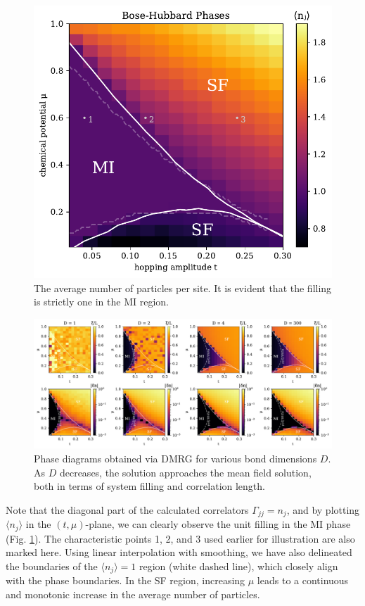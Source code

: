 \begin{figure}[b]
\includegraphics[width=0.9\linewidth]{imgs/phases.pdf}
\caption{The average number of particles per site. It is evident that the filling is strictly one in the MI region.}
\label{fig:phases}
\end{figure}


\begin{figure}[t]
    \centering
    \includegraphics[width=\textwidth]{imgs/phases2mf.pdf}
    \caption{Phase diagrams obtained via DMRG for various bond dimensions $D$. As $D$ decreases, the solution approaches the mean field solution, both in terms of system filling and correlation length.}
    \label{fig:mf}
\end{figure}


Note that the diagonal part of the calculated correlators $\Gamma_{jj} = n_j$, and by plotting $\langle n_j\rangle$ in the $(t, \mu)$-plane, we can clearly observe the unit filling in the MI phase (Fig. \ref{fig:phases}). The characteristic points 1, 2, and 3 used earlier for illustration are also marked here. Using linear interpolation with smoothing, we have also delineated the boundaries of the $\langle n_j\rangle = 1$ region (white dashed line), which closely align with the phase boundaries. In the SF region, increasing $\mu$ leads to a continuous and monotonic increase in the average number of particles.
